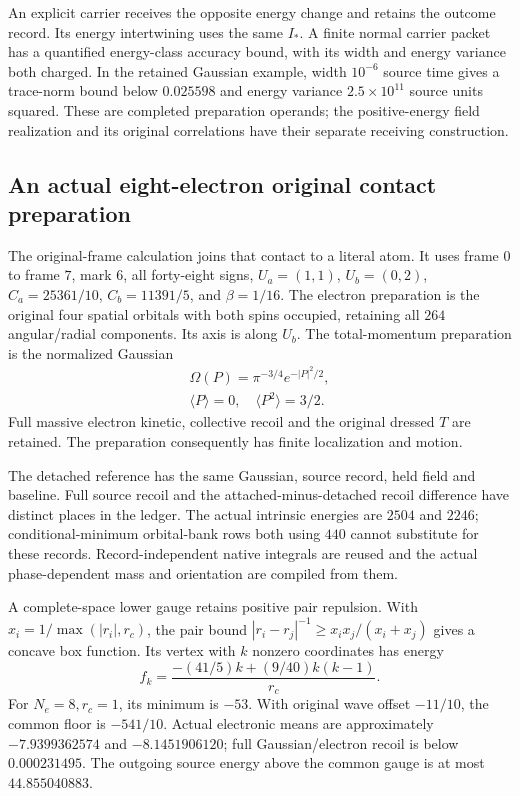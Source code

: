 An explicit carrier receives the opposite energy change and retains the outcome record. Its energy intertwining uses the same $I_*$. A finite normal carrier packet has a quantified energy-class accuracy bound, with its width and energy variance both charged. In the retained Gaussian example, width $10^{-6}$ source time gives a trace-norm bound below $0.025598$ and energy variance $2.5\times10^{11}$ source units squared. These are completed preparation operands; the positive-energy field realization and its original correlations have their separate receiving construction.

\subsection{An actual eight-electron original contact preparation}

The original-frame calculation joins that contact to a literal atom. It uses frame $0$ to frame $7$, mark $6$, all forty-eight signs, $U_a=(1,1)$, $U_b=(0,2)$, $C_a=25361/10$, $C_b=11391/5$, and $\beta=1/16$. The electron preparation is the original four spatial orbitals with both spins occupied, retaining all $264$ angular/radial components. Its axis is along $U_b$. The total-momentum preparation is the normalized Gaussian
\[
\begin{gathered}
\Omega(P)=\pi^{-3/4}e^{-|P|^2/2},\\
 \langle P\rangle=0,\quad\langle P^2\rangle=3/2.
\end{gathered}
\]
Full massive electron kinetic, collective recoil and the original dressed $T$ are retained. The preparation consequently has finite localization and motion. 

The detached reference has the same Gaussian, source record, held field and baseline. Full source recoil and the attached-minus-detached recoil difference have distinct places in the ledger. The actual intrinsic energies are $2504$ and $2246$; conditional-minimum orbital-bank rows both using $440$ cannot substitute for these records. Record-independent native integrals are reused and the actual phase-dependent mass and orientation are compiled from them.

A complete-space lower gauge retains positive pair repulsion. With $x_i=1/\max(|r_i|,r_c)$, the pair bound $|r_i-r_j|^{-1}\geq x_ix_j/(x_i+x_j)$ gives a concave box function. Its vertex with $k$ nonzero coordinates has energy
\[
 f_k=\frac{-(41/5)k+(9/40)k(k-1)}{r_c}.
\]
For $N_e=8,r_c=1$, its minimum is $-53$. With original wave offset $-11/10$, the common floor is $-541/10$. Actual electronic means are approximately $-7.9399362574$ and $-8.1451906120$; full Gaussian/electron recoil is below $0.000231495$. The outgoing source energy above the common gauge is at most $44.855040883$.

